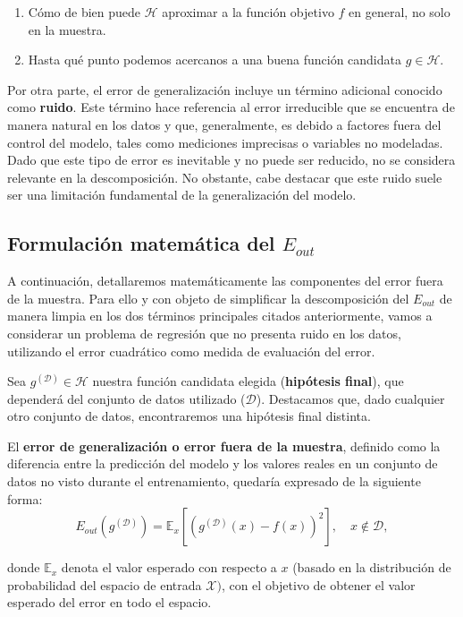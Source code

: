 \begin{enumerate}
    \item Cómo de bien puede $\mathcal{H}$ aproximar a la función objetivo $f$ en general, no solo en la muestra.
    \item Hasta qué punto podemos acercanos a una buena función candidata $g \in \mathcal{H}$.
\end{enumerate}

Por otra parte, el error de generalización incluye un término adicional conocido como \textbf{ruido}. Este término hace referencia al error irreducible que se encuentra de manera natural en los datos y que, generalmente, es debido a factores fuera del control del modelo, tales como mediciones imprecisas o variables no modeladas. Dado que este tipo de error es inevitable y no puede ser reducido, no se considera relevante en la descomposición. No obstante, cabe destacar que este ruido suele ser una limitación fundamental de la generalización del modelo.

\subsection{Formulación matemática del $E_{out}$}\label{sec:formulacion-matematica-Eout}
A continuación, detallaremos matemáticamente las componentes del error fuera de la muestra. Para ello y con objeto de simplificar la descomposición del $E_{out}$ de manera limpia en los dos términos principales citados anteriormente, vamos a considerar un problema de regresión que no presenta ruido en los datos, utilizando el error cuadrático como medida de evaluación del error.

Sea $g^{\mathcal{(D)}} \in \mathcal{H}$ nuestra función candidata elegida (\textbf{hipótesis final}), que dependerá del conjunto de datos utilizado ($\mathcal{D}$). Destacamos que, dado cualquier otro conjunto de datos, encontraremos una hipótesis final distinta.

El \textbf{error de generalización o error fuera de la muestra}, definido como la diferencia entre la predicción del modelo y los valores reales en un conjunto de datos no visto durante el entrenamiento, quedaría expresado de la siguiente forma:
\begin{equation}\label{eq:E_out1}
    E_{out}(g^{\mathcal{(D)}}) = \mathbb{E}_{x}[{(g^{\mathcal{(D)}}(x) - f(x))}^2], \quad x \notin \mathcal{D},
\end{equation}

donde $\mathbb{E}_{x}$ denota el valor esperado con respecto a $x$ (basado en la distribución de probabilidad del espacio de entrada $\mathcal{X})$, con el objetivo de obtener el valor esperado del error en todo el espacio.

